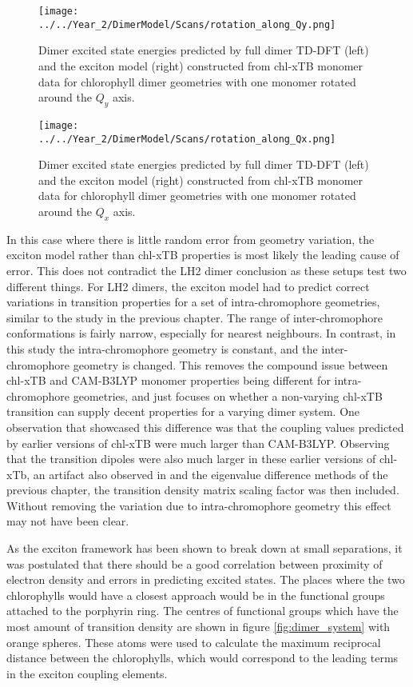 \begin{figure}
    \centering
    \texttt{[image: ../../Year\_2/DimerModel/Scans/rotation\_along\_Qy.png]}
    \caption{Dimer excited state energies predicted by full dimer TD-DFT (left)
    and the exciton model (right) constructed from chl-xTB monomer data for chlorophyll 
    dimer geometries with one monomer rotated around the $Q_y$ axis.}
    \label{fig:chl_xtb_rot_Qy}
\end{figure}

\begin{figure}
    \centering
    \texttt{[image: ../../Year\_2/DimerModel/Scans/rotation\_along\_Qx.png]}
    \caption{Dimer excited state energies predicted by full dimer TD-DFT (left)
    and the exciton model (right) constructed from chl-xTB monomer data for chlorophyll 
    dimer geometries with one monomer rotated around the $Q_x$ axis.}
    \label{fig:chl_xtb_rot_Qx}
\end{figure}

In this case where there is little random error from geometry variation, the exciton
model rather than chl-xTB properties is most likely the leading cause of error. 
This does not contradict the LH2 dimer conclusion as these setups test two different
things. For LH2 dimers, the exciton model had to predict correct variations in transition
properties for a set of intra-chromophore geometries, similar to the study in the 
previous chapter. The range of inter-chromophore conformations is fairly narrow,
especially for nearest neighbours. In contrast, in this study the intra-chromophore 
geometry is constant, and the inter-chromophore geometry is changed. This removes
the compound issue between chl-xTB and CAM-B3LYP monomer properties being different
for intra-chromophore geometries, and just focuses on whether a non-varying chl-xTB
transition can supply decent properties for a varying dimer system. One observation
that showcased this difference was that the coupling values predicted by earlier
versions of chl-xTB were much larger than CAM-B3LYP. Observing that the transition
dipoles were also much larger in these earlier versions of chl-xTb, an artifact 
also observed in \dscf and the eigenvalue difference methods of the previous chapter,
the transition density matrix scaling factor was then included. Without removing
the variation due to intra-chromophore geometry this effect may not have been clear.

As the exciton framework has been shown to break down at small separations, it was
postulated that there should be a good correlation between proximity of electron
density and errors in predicting excited states. The places where the two chlorophylls
would have a closest approach would be in the functional groups attached to the 
porphyrin ring. The centres of functional groups which have the most amount of transition
density are shown in figure \ref{fig:dimer_system} with orange spheres. These atoms
were used to calculate the maximum reciprocal distance between the chlorophylls, 
which would correspond to the leading terms in the exciton coupling elements.

